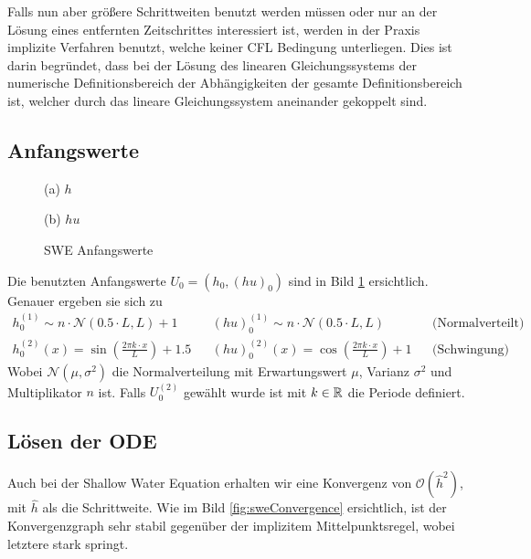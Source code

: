 Falls nun aber größere Schrittweiten benutzt werden müssen oder nur an der Lösung eines entfernten Zeitschrittes interessiert ist, werden in der Praxis implizite Verfahren benutzt, welche keiner CFL Bedingung unterliegen. Dies ist darin begründet, dass bei der Lösung des linearen Gleichungssystems der numerische Definitionsbereich der Abhängigkeiten der gesamte Definitionsbereich ist, welcher durch das lineare Gleichungssystem aneinander gekoppelt sind.

\subsection{Anfangswerte}
\begin{figure}[H]
\footnotesize
\centering
\begin{minipage}[b]{0.49\linewidth}

\caption*{(a) $h$}
\end{minipage}
\begin{minipage}[b]{0.49\linewidth}

\caption*{(b) $hu$}
\end{minipage}
\caption{SWE Anfangswerte}
\label{fig:sweInitialValues}
\end{figure}
Die benutzten Anfangswerte $U_0 = (h_0,(hu)_0)$ sind in Bild \ref{fig:sweInitialValues} ersichtlich. Genauer ergeben sie sich zu
\[
\begin{aligned}
 h_0^{(1)} \sim n\cdot\mathcal N(0.5\cdot L,L) + 1 &&(hu)_0^{(1)}\sim n\cdot\mathcal N(0.5\cdot L,L) && \text{(Normalverteilt)}\\
 h_0^{(2)}(x)= \sin\left( \frac{2\pi k\cdot x}{L}\right) + 1.5 &&(hu)_0^{(2)}(x) = \cos\left( \frac{2\pi k\cdot x}{L}\right) + 1  && \text{(Schwingung)}
\end{aligned}
\]
Wobei $\mathcal N(\mu, \sigma^2)$ die Normalverteilung mit Erwartungswert $\mu$, Varianz $\sigma^2$ und Multiplikator $n$ ist. Falls $U_0^{(2)}$ gewählt wurde ist mit $k\in \mathbb{R}$ die Periode definiert. 
\subsection{Lösen der ODE}
Auch bei der Shallow Water Equation erhalten wir eine Konvergenz von $\mathcal O(\hat h^2)$, mit $\hat h$ als die Schrittweite. Wie im Bild \ref{fig:sweConvergence} ersichtlich, ist der Konvergenzgraph sehr stabil gegenüber der implizitem Mittelpunktsregel, wobei letztere stark springt.

